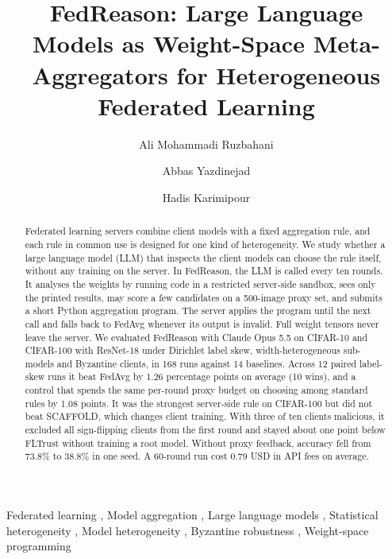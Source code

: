\documentclass[3p,times,a4paper]{elsarticle}
\begin{document}
\begin{frontmatter}

\title{FedReason: Large Language Models as Weight-Space Meta-Aggregators for Heterogeneous Federated Learning}

\author[ucal]{Ali Mohammadi Ruzbahani}
\author[ureg]{Abbas Yazdinejad}
\author[ucal]{Hadis Karimipour}



\begin{abstract}
Federated learning servers combine client models with a fixed aggregation rule, and each rule in common use is designed for one kind of heterogeneity. We study whether a large language model (LLM) that inspects the client models can choose the rule itself, without any training on the server. In FedReason, the LLM is called every ten rounds. It analyses the weights by running code in a restricted server-side sandbox, sees only the printed results, may score a few candidates on a 500-image proxy set, and submits a short Python aggregation program. The server applies the program until the next call and falls back to FedAvg whenever its output is invalid. Full weight tensors never leave the server. We evaluated FedReason with Claude Opus 5.5 on CIFAR-10 and CIFAR-100 with ResNet-18 under Dirichlet label skew, width-heterogeneous sub-models and Byzantine clients, in 168 runs against 14 baselines. Across 12 paired label-skew runs it beat FedAvg by 1.26 percentage points on average (10 wins), and a control that spends the same per-round proxy budget on choosing among standard rules by 1.08 points. It was the strongest server-side rule on CIFAR-100 but did not beat SCAFFOLD, which changes client training. With three of ten clients malicious, it excluded all sign-flipping clients from the first round and stayed about one point below FLTrust without training a root model. Without proxy feedback, accuracy fell from 73.8\% to 38.8\% in one seed. A 60-round run cost 0.79 USD in API fees on average.
\end{abstract}

\begin{keyword}
Federated learning \sep
Model aggregation \sep
Large language models \sep
Statistical heterogeneity \sep
Model heterogeneity \sep
Byzantine robustness \sep
Weight-space programming
\end{keyword}

\end{frontmatter}
\end{document}

